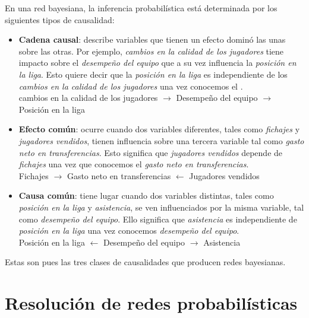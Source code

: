 En una red bayesiana, la inferencia probabilística está determinada por los siguientes tipos de causalidad: 
\begin{itemize}
    \item \textbf{Cadena causal}: describe variables que tienen un efecto dominó las unas sobre las otras. Por ejemplo, \textit{cambios en la calidad de 
    los jugadores} tiene impacto sobre el \textit{desempeño del equipo} que a su vez influencia la \textit{posición en la liga}. 
    Esto quiere decir que la \textit{posición en la liga} es independiente de los \textit{cambios en la calidad de los jugadores} una vez conocemos el .\\
    cambios en la calidad de los jugadores $\rightarrow$ Desempeño del equipo $\rightarrow$ Posición en la liga
    \item \textbf{Efecto común}: ocurre cuando dos variables diferentes, tales como \textit{fichajes} y \textit{jugadores vendidos}, tienen influencia sobre una tercera variable tal como 
    \textit{gasto neto en transferencias}. Esto significa que \textit{jugadores vendidos} depende de \textit{fichajes} una vez que conocemos el \textit{gasto neto en transferencias}.\\
    Fichajes $\rightarrow$ Gasto neto en transferencias $\leftarrow$ Jugadores vendidos    
    \item \textbf{Causa común}: tiene lugar cuando dos variables distintas, tales como \textit{posición en la liga} y \textit{asistencia}, se ven influenciados por la misma variable, tal 
    como \textit{desempeño del equipo}. Ello significa que \textit{asistencia} es independiente de \textit{posición en la liga} una vez conocemos \textit{desempeño del equipo}.\\
    Posición en la liga $\leftarrow$ Desempeño del equipo $\rightarrow$ Asistencia
\end{itemize}

Estas son pues las tres clases de causalidades que producen redes bayesianas.
\section{Resolución de redes probabilísticas}

